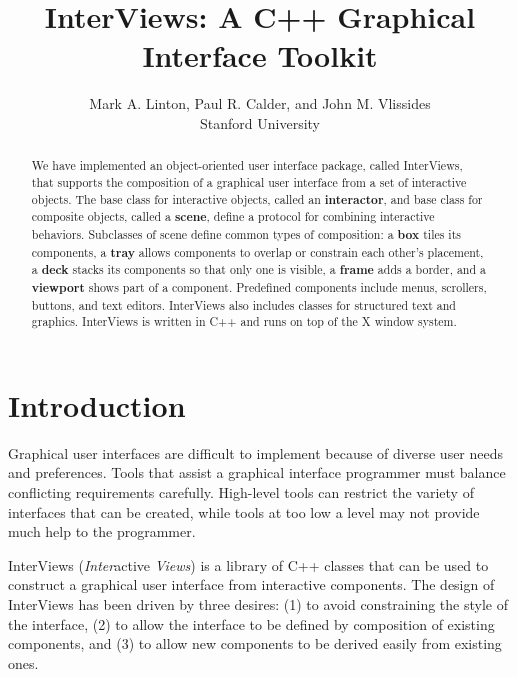 \title{InterViews: A C++ Graphical Interface Toolkit}
\author{Mark A. Linton, Paul R. Calder, and John M. Vlissides\\
Stanford University}


\maketitle
\thispagestyle{empty}

\begin{abstract}
We have implemented an object-oriented user interface package,
called InterViews, that supports the composition of
a graphical user interface from a set of interactive objects.
The base class for interactive objects,
called an {\bf interactor}, and
base class for composite objects, called a {\bf scene},
define a protocol for combining interactive behaviors.
Subclasses of scene define common types of composition:
a {\bf box} tiles its components,
a {\bf tray} allows components to overlap or constrain each other's placement,
a {\bf deck} stacks its components so that only one is visible,
a {\bf frame} adds a border,
and a {\bf viewport} shows part of a component.
Predefined components include menus, scrollers, buttons, and text editors.
InterViews also includes
classes for structured text and graphics.
InterViews is written in C++ and runs on top of the X window system.
\end{abstract}

\section{Introduction}
Graphical user interfaces are difficult to implement because of diverse user
needs and preferences.  Tools that assist a graphical interface programmer
must balance conflicting requirements carefully.  High-level tools can restrict
the variety of interfaces that can be created, while tools at too low
a level may not provide much help to the programmer.

InterViews ({\em Inter}\/active {\em Views}) is a library of C++\cite{c++}
classes that can be used to construct a graphical user interface
from interactive components.  The design of InterViews has been driven
by three desires: (1) to
avoid constraining the style of the interface, (2) to allow the
interface to be defined by composition of existing components, and (3) to
allow new components to be derived easily from existing ones.

